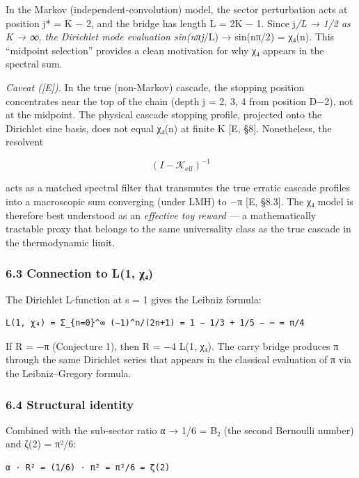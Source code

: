 \documentclass[
  11pt,
]{article}
\begin{document}
In the Markov (independent-convolution) model, the sector perturbation acts at
position j* = K − 2, and the bridge has length L = 2K − 1. Since j\emph{/L → 1/2
as K → ∞, the Dirichlet mode evaluation sin(nπj}/L) → sin(nπ/2) = χ₄(n). This
``midpoint selection'' provides a clean motivation for why χ₄ appears in the
spectral sum.

\emph{Caveat ({[}E{]}).} In the true (non-Markov) cascade, the stopping position
concentrates near the top of the chain (depth j = 2, 3, 4 from position D−2),
not at the midpoint. The physical cascade stopping profile, projected onto the
Dirichlet sine basis, does not equal χ₄(n) at finite K {[}E, §8{]}. Nonetheless,
the resolvent

\[(I - \mathcal{K}_{\mathrm{eff}})^{-1}\]

acts as a matched spectral filter that transmutes the true erratic cascade
profiles into a macroscopic sum converging (under LMH) to −π {[}E, §8.3{]}. The
χ₄ model is therefore best understood as an \emph{effective toy reward} --- a
mathematically tractable proxy that belongs to the same universality class as
the true cascade in the thermodynamic limit.

\subsubsection{6.3 Connection to L(1, χ₄)}\label{connection-to-l1-ux3c7ux2084}

The Dirichlet L-function at s = 1 gives the Leibniz formula:

\begin{verbatim}
L(1, χ₄) = Σ_{n=0}^∞ (−1)^n/(2n+1) = 1 − 1/3 + 1/5 − ⋯ = π/4
\end{verbatim}

If R = −π (Conjecture 1), then R = −4 L(1, χ₄). The carry bridge produces π
through the same Dirichlet series that appears in the classical evaluation of π
via the Leibniz--Gregory formula.

\subsubsection{6.4 Structural identity}\label{structural-identity}

Combined with the sub-sector ratio α → 1/6 = B₂ (the second Bernoulli number)
and ζ(2) = π²/6:

\begin{verbatim}
α · R² = (1/6) · π² = π²/6 = ζ(2)
\end{verbatim}
\end{document}

